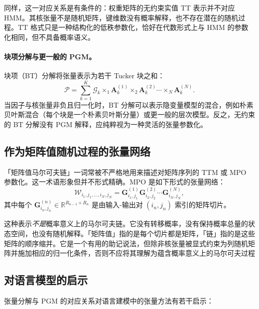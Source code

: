 \documentclass[11pt]{article}
\newcommand{\R}{\mathbb{R}}
\newcommand{\ten}[1]{\mathcal{#1}}
\newcommand{\mat}[1]{\mathbf{#1}}
\begin{document}
同样，这一对应关系是有条件的：权重矩阵的无约束实值 TT 表示并不对应 HMM。其核张量不是随机矩阵，键维数没有概率解释，也不存在潜在的随机过程。TT 格式只是一种结构化的低秩参数化，恰好在代数形式上与 HMM 的参数化相同，但不具备概率语义。

\paragraph{块项分解与更一般的 PGM。}
块项（BT）分解将张量表示为若干 Tucker 块之和：
\begin{equation}
\ten{P} = \sum_{k=1}^{K} \ten{G}_k \times_1 \mat{A}^{(1)}_k \times_2 \mat{A}^{(2)}_k \cdots \times_N \mat{A}^{(N)}_k.
\end{equation}
当因子与核张量非负且归一化时，BT 分解可以表示隐变量模型的混合，例如朴素贝叶斯混合（每个块是一个朴素贝叶斯分量）或更一般的层次模型。反之，无约束的 BT 分解没有 PGM 解释，应纯粹视为一种灵活的张量参数化。

\subsection{作为矩阵值随机过程的张量网络}

「矩阵值马尔可夫链」一词常被不严格地用来描述对矩阵序列的 TTM 或 MPO 参数化。这一术语形象但并不形式精确。MPO 是如下形式的张量网络：
\begin{equation}
\ten{W}_{i_1,j_1,\dots,i_N,j_N} = \mat{G}^{(1)}_{i_1,j_1} \mat{G}^{(2)}_{i_2,j_2} \cdots \mat{G}^{(N)}_{i_N,j_N},
\end{equation}
其中每个 $\mat{G}^{(n)}_{i_n,j_n} \in \R^{R_{n-1} \times R_n}$ 是由输入-输出对 $(i_n, j_n)$ 索引的矩阵切片。

这种表示\emph{不是}概率意义上的马尔可夫链。它没有转移概率，没有保持概率总量的状态空间，也没有随机解释。「矩阵值」指的是每个切片都是矩阵，「链」指的是这些矩阵的顺序缩并。它是一个有用的助记说法，但除非核张量被显式约束为列随机矩阵并施加相应的归一化条件，否则不应将其理解为蕴含概率意义上的马尔可夫过程

\subsection{对语言模型的启示}

张量分解与 PGM 的对应关系对语言建模中的张量方法有若干启示：
\end{document}
